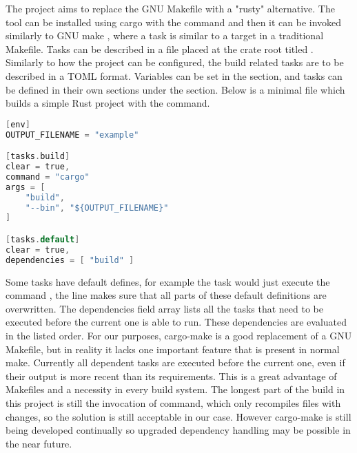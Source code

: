 The  \cite{CargoMake} project aims to replace the GNU Makefile with a "rusty" alternative. The tool can be installed using cargo with the command  and then it can be invoked similarly to GNU make , where a task is similar to a target in a traditional Makefile. Tasks can be described in a file placed at the crate root titled . Similarly to how the project can be configured, the build related tasks are to be described in a TOML format. Variables can be set in the \mycode{[env]} section, and tasks can be defined in their own sections under the  section. Below is a minimal  file which builds a simple Rust project with the  command.

\begin{lstlisting}[language=C,frame=single,float=!ht]
[env]
OUTPUT_FILENAME = "example"

[tasks.build]
clear = true,
command = "cargo"
args = [
    "build",
    "--bin", "${OUTPUT_FILENAME}"
]

[tasks.default]
clear = true,
dependencies = [ "build" ]
\end{lstlisting}

Some tasks have default defines, for example the  task would just execute the command , the  line makes sure that all parts of these default definitions are overwritten. The dependencies field array lists all the tasks that need to be executed before the current one is able to run. These dependencies are evaluated in the listed order. For our purposes, cargo-make is a good replacement of a GNU Makefile, but in reality it lacks one important feature that is present in normal make. Currently all dependent tasks are executed before the current one, even if their output is more recent than its requirements. This is a great advantage of Makefiles and a necessity in every build system. The longest part of the build in this project is still the invocation of  command, which only recompiles files with changes, so the solution is still acceptable in our case. However cargo-make is still being developed continually so upgraded dependency handling may be possible in the near future.
